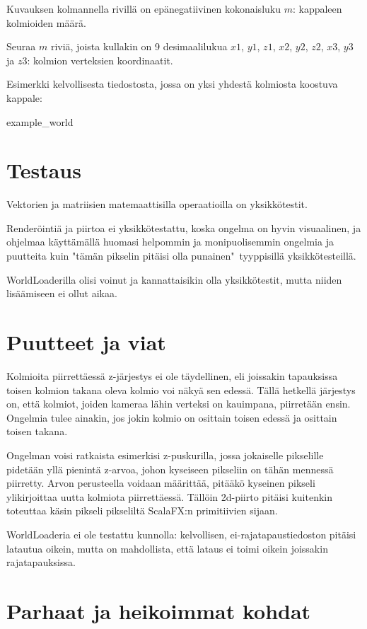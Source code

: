\documentclass[12pt] {article}
\begin{document}
Kuvauksen kolmannella rivillä on epänegatiivinen kokonaisluku $m$: kappaleen kolmioiden määrä.

Seuraa $m$ riviä, joista kullakin on 9 desimaalilukua $x1$, $y1$, $z1$, $x2$, $y2$, $z2$, $x3$, $y3$ ja $z3$: kolmion verteksien koordinaatit.

Esimerkki kelvollisesta tiedostosta, jossa on yksi yhdestä kolmiosta koostuva kappale:

 {example_world}

\section {Testaus}

Vektorien ja matriisien matemaattisilla operaatioilla on yksikkötestit.

Renderöintiä ja piirtoa ei yksikkötestattu, koska ongelma on hyvin visuaalinen, ja ohjelmaa käyttämällä huomasi helpommin ja monipuolisemmin ongelmia ja puutteita kuin "tämän pikselin pitäisi olla punainen"\ tyyppisillä yksikkötesteillä.

WorldLoaderilla olisi voinut ja kannattaisikin olla yksikkötestit, mutta niiden lisäämiseen ei ollut aikaa.

\section {Puutteet ja viat}

Kolmioita piirrettäessä z-järjestys ei ole täydellinen, eli joissakin tapauksissa toisen kolmion takana oleva kolmio voi näkyä sen edessä. Tällä hetkellä järjestys on, että kolmiot, joiden kameraa lähin verteksi on kauimpana, piirretään ensin. Ongelmia tulee ainakin, jos jokin kolmio on osittain toisen edessä ja osittain toisen takana.

Ongelman voisi ratkaista esimerkisi z-puskurilla, jossa jokaiselle pikselille pidetään yllä pienintä z-arvoa, johon kyseiseen pikseliin on tähän mennessä piirretty. Arvon perusteella voidaan määrittää, pitääkö kyseinen pikseli ylikirjoittaa uutta kolmiota piirrettäessä. Tällöin 2d-piirto pitäisi kuitenkin toteuttaa käsin pikseli pikseliltä ScalaFX:n primitiivien sijaan.

WorldLoaderia ei ole testattu kunnolla: kelvollisen, ei-rajatapaustiedoston pitäisi latautua oikein, mutta on mahdollista, että lataus ei toimi oikein joissakin rajatapauksissa.

\section {Parhaat ja heikoimmat kohdat}
\end{document}
